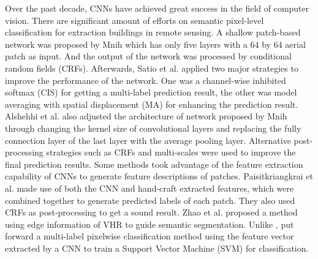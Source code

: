 Over the past decade, CNNs have achieved great success in the field of computer vision. There are significant amount of efforts on semantic pixel-level classification for extraction buildings in remote sensing. A shallow patch-based network was proposed by Mnih \cite{IEEEexample:mnih2013machine} which has only five layers with a 64 by 64 aerial patch as input. And the output of the network was processed by conditional random fields (CRFs). Afterwards, Satio et al.\cite{IEEEexample:saito2016multiple} applied two major strategies to improve the performance of the network. One was a channel-wise inhibited softmax (CIS) for getting a multi-label prediction result, the other was model averaging with spatial displacement (MA) for enhancing the prediction result. Alshehhi et al. \cite{IEEEexample:alshehhi2017simultaneous} also adjusted the architecture of network proposed by Mnih through changing the kernel size of convolutional layers and replacing the fully connection layer of the last layer with the average pooling layer. Alternative post-processing strategies such as CRFs and multi-scales were used to improve the final prediction results. Some methods took advantage of the feature extraction capability of CNNs to generate feature descriptions of patches. Paisitkriangkrai et al. \cite{IEEEexample:paisitkriangkrai2015effective} made use of both the CNN and hand-craft extracted features, which were combined together to generate predicted labels of each patch. They also used CRFs as post-processing to get a sound result. Zhao et al. \cite{IEEEexample:zhao2017contextually} proposed a method using edge information of VHR to guide semantic segmentation. Unlike \cite{IEEEexample:paisitkriangkrai2015effective}, \cite{IEEEexample:he2017multi} put forward a multi-label pixelwise classification method using the feature vector extracted by a CNN to train a Support Vector Machine (SVM) for classification.\par
